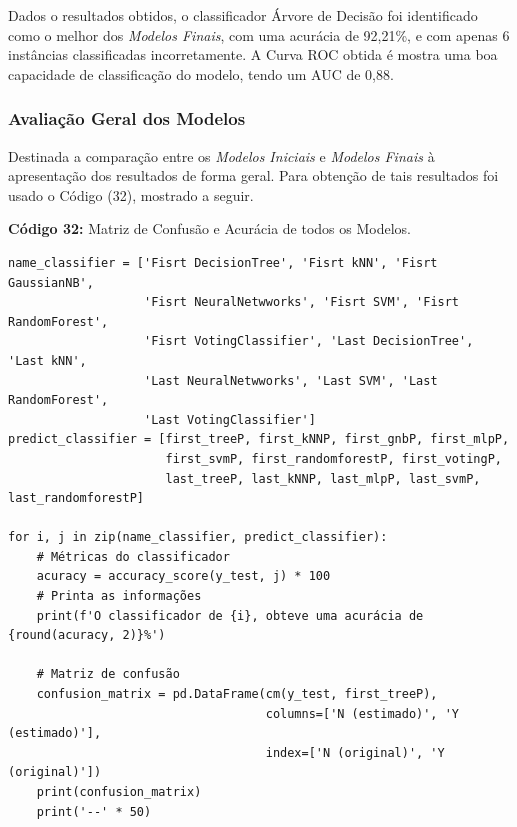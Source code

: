 \documentclass[a4paper,12pt]{article} %
\begin{document}
Dados o resultados obtidos, o classificador Árvore de Decisão foi identificado como o melhor dos \textit{Modelos Finais}, com uma acurácia de 92,21\%, e com apenas 6 instâncias classificadas incorretamente. A Curva ROC obtida é mostra uma boa capacidade de classificação do modelo, tendo um AUC de 0,88.


\subsubsection{Avaliação Geral dos Modelos}
Destinada a comparação entre os \textit{Modelos Iniciais} e \textit{Modelos Finais} à apresentação dos resultados de forma geral. Para obtenção de tais resultados foi usado o Código (32), mostrado  a seguir.
\begin{center}
\textbf{Código 32:} Matriz de Confusão e Acurácia de todos os Modelos.
\begin{verbatim}
name_classifier = ['Fisrt DecisionTree', 'Fisrt kNN', 'Fisrt GaussianNB',
                   'Fisrt NeuralNetwworks', 'Fisrt SVM', 'Fisrt RandomForest',
                   'Fisrt VotingClassifier', 'Last DecisionTree', 'Last kNN',
                   'Last NeuralNetwworks', 'Last SVM', 'Last RandomForest',
                   'Last VotingClassifier']
predict_classifier = [first_treeP, first_kNNP, first_gnbP, first_mlpP,
                      first_svmP, first_randomforestP, first_votingP,
                      last_treeP, last_kNNP, last_mlpP, last_svmP, last_randomforestP]

for i, j in zip(name_classifier, predict_classifier):
    # Métricas do classificador
    acuracy = accuracy_score(y_test, j) * 100
    # Printa as informações
    print(f'O classificador de {i}, obteve uma acurácia de {round(acuracy, 2)}%')

    # Matriz de confusão
    confusion_matrix = pd.DataFrame(cm(y_test, first_treeP),
                                    columns=['N (estimado)', 'Y (estimado)'],
                                    index=['N (original)', 'Y (original)'])
    print(confusion_matrix)
    print('--' * 50)
\end{verbatim}
\end{center}
\end{document}
